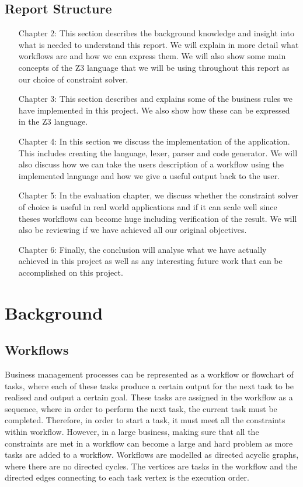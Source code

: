 \documentclass[a4paper]{report}
\begin{document}
\section{Report Structure}
\begin{itemize}
\item[Chapter 2:] This section describes the background knowledge and insight into what is needed to understand this report. We will explain in more detail what workflows are and how we can express them. We will also show some main concepts of the Z3 language that we will be using throughout this report as our choice of constraint solver.  
\item[Chapter 3:] This section describes and explains some of the business rules we have implemented in this project. We also show how these can be expressed in the Z3 language. 
\item[Chapter 4:] In this section we discuss the implementation of the application. This includes creating the language, lexer, parser and code generator. We will also discuss how we can take the users description of a workflow using the implemented language and how we give a useful output back to the user.
\item[Chapter 5:] In the evaluation chapter, we discuss whether the constraint solver of choice is useful in real world applications and if it can scale well since theses workflows can become huge including verification of the result. We will also be reviewing if we have achieved all our original objectives. 
\item[Chapter 6:] Finally, the conclusion will analyse what we have actually achieved in this project as well as any interesting future work that can be accomplished on this project. 
\end{itemize}


\chapter{Background}
\section{Workflows}
Business management processes can be represented as a workflow or flowchart of tasks, where each of these tasks produce a certain output for the next task to be realised and output a certain goal. These tasks are assigned in the workflow as a sequence, where in order to perform the next task, the current task must be completed. Therefore, in order to start a task, it must meet all the constraints within workflow. However, in a large business, making sure that all the constraints are met in a workflow can become a large and hard problem as more tasks are added to a workflow. Workflows are modelled as directed acyclic graphs\cite{AcyclicDigraph}, where there are no directed cycles. The vertices are tasks in the workflow and the directed edges connecting to each task vertex is the execution order. \\
\end{document}
